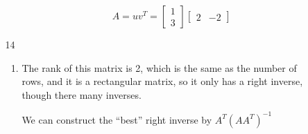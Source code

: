\documentclass[12pt,letterpaper]{article}
\begin{document}
\begin{enumerate}[label=\S 2.\arabic*]
\begin{enumerate}
\begin{enumerate}
              \[
                A = uv^T =
                \begin{bmatrix}
                  1 \\
                  3
                \end{bmatrix}
                \begin{bmatrix}
                  2 & -2
                \end{bmatrix}
              \]
          \end{enumerate}
        \item [14]
          \begin{enumerate}
            \item
              The rank of this matrix is 2, which is the same as the number of rows, and it is a rectangular matrix, so it only has a right inverse, though there many inverses.

              We can construct the ``best'' right inverse by $A^T(AA^T)^{-1}$


\end{enumerate}
\end{enumerate}
\end{enumerate}
\end{document}
